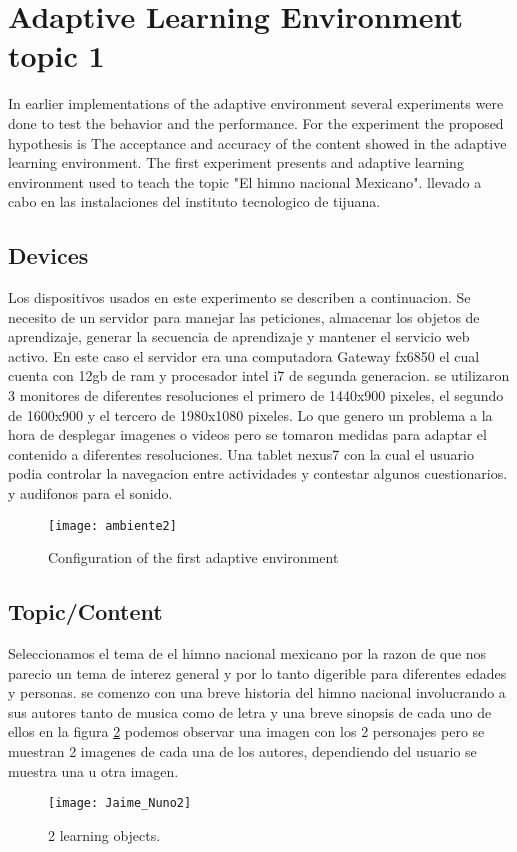 \section{Adaptive Learning Environment topic 1}
In earlier implementations of the adaptive environment several experiments were done to test the behavior and the performance. For the experiment the proposed hypothesis is The acceptance and accuracy of the content showed in the adaptive learning environment. The first experiment presents and adaptive learning environment used to teach the topic "El himno nacional Mexicano". llevado a cabo en las instalaciones del instituto tecnologico de tijuana. 
\subsection{Devices}
Los dispositivos usados en este experimento se describen a continuacion. Se necesito de un servidor para manejar las peticiones, almacenar los objetos de aprendizaje, generar la secuencia de aprendizaje y mantener el servicio web activo. En este caso el servidor era una computadora Gateway fx6850 el cual cuenta con 12gb de ram y procesador intel i7 de segunda generacion. se utilizaron 3 monitores de diferentes resoluciones el primero de 1440x900 pixeles, el segundo de 1600x900 y el tercero de 1980x1080 pixeles. Lo que genero un problema a la hora de desplegar imagenes o videos pero se tomaron medidas para adaptar el contenido a diferentes resoluciones. Una tablet nexus7 con la cual el usuario podia controlar la navegacion entre actividades y contestar algunos cuestionarios. y audifonos para el sonido.

\begin{figure}[ht!]  
\centering  
\texttt{[image: ambiente2]}
\quad  
\caption{Configuration of the first adaptive environment}  
\label{ambiente2}  
\end{figure}
  

\subsection{Topic/Content}
Seleccionamos el tema de el himno nacional mexicano por la razon de que nos parecio un tema de interez general y por lo tanto digerible para diferentes edades y personas.
se comenzo con una breve historia del himno nacional involucrando a sus autores tanto de musica como de letra y una breve sinopsis de cada uno de ellos en la figura \ref{Nuno2} podemos observar una imagen con los 2 personajes pero se muestran 2 imagenes de cada una de los autores, dependiendo del usuario se muestra una u otra imagen.
\begin{figure}[ht!]  
\centering  
\texttt{[image: Jaime\_Nuno2]}
\quad  
\caption{2 learning objects.}  
\label{Nuno2}  
\end{figure}

